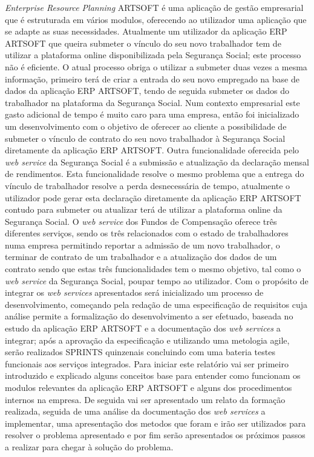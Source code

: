 \documentclass[sigplan]{acmart}
\begin{document}
\textit{Enterprise Resource Planning} ARTSOFT é uma aplicação de gestão empresarial que é estruturada em vários modulos, oferecendo ao utilizador uma aplicação que se adapte as suas necessidades. Atualmente um utilizador da aplicação ERP ARTSOFT que queira submeter o vínculo do seu novo trabalhador tem de utilizar a plataforma online disponibilizada pela Segurança Social; este processo não é eficiente. O atual processo obriga o utilizar a submeter duas vezes a mesma informação, primeiro terá de criar a entrada do seu novo empregado na base de dados da aplicação ERP ARTSOFT, tendo de seguida submeter os dados do trabalhador na plataforma da Segurança Social. Num contexto empresarial este gasto adicional de tempo é muito caro para uma empresa, então foi inicializado um desenvolvimento com o objetivo de oferecer ao cliente a possibilidade de submeter o vínculo de contrato do seu novo trabalhador à Segurança Social diretamente da aplicação ERP ARTSOFT. Outra funcionalidade oferecida pelo \textit{web service} da Segurança Social é a submissão e atualização da declaração mensal de rendimentos. Esta funcionalidade resolve o mesmo problema que a entrega do vínculo de trabalhador resolve a perda desnecessária de tempo, atualmente o utilizador pode gerar esta declaração diretamente da aplicação ERP ARTSOFT contudo para submeter ou atualizar terá de utilizar a plataforma online da Segurança Social. O \textit{web service} dos Fundos de Compensação oferece três diferentes serviços, sendo os três relacionados com o estado de trabalhadores numa empresa permitindo reportar a admissão de um novo trabalhador, o terminar de contrato de um trabalhador e a atualização dos dados de um contrato sendo que estas três funcionalidades tem o mesmo objetivo, tal como o \textit{web service} da Segurança Social, poupar tempo ao utilizador. Com o propósito de integrar os \textit{web services} apresentados será inicializado um processo de desenvolvimento, começando pela redação de uma especificação de requisitos cuja análise permite a formalização do desenvolvimento a ser efetuado, baseada no estudo da aplicação ERP ARTSOFT e a documentação dos \textit{web services} a integrar; após a aprovação da especificação e utilizando uma metologia agile, serão realizados SPRINTS quinzenais concluindo com uma bateria testes funcionais aos serviços integrados. Para iniciar este relatório vai ser primeiro introduzido e explicado alguns conceitos base para entender como funcionam os modulos relevantes da aplicação ERP ARTSOFT e alguns dos procedimentos internos na empresa. De seguida vai ser apresentado um relato da formação realizada, seguida de uma análise da documentação dos \textit{web services} a implementar, uma apresentação dos metodos que foram e irão ser utilizados para resolver o problema apresentado e por fim serão apresentados os próximos passos a realizar para chegar à solução do problema.
\end{document}
